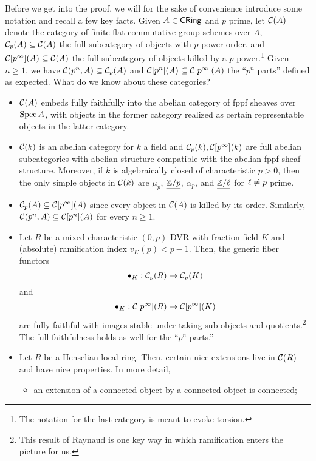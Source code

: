 \documentclass[11pt]{article}
\begin{document}
Before we get into the proof, we will for the sake of convenience introduce some notation and recall a few key facts. Given $A\in\operatorname{\mathsf{CRing}}$ and $p$ prime, let $\mathcal{C}(A)$ denote the category of finite flat commutative group schemes over $A$, $\mathcal{C}_p(A)\subseteq\mathcal{C}(A)$ the full subcategory of objects with $p$-power order, and $\mathcal{C}[p^{\infty}](A)\subseteq\mathcal{C}(A)$ the full subcategory of objects killed by a $p$-power.\footnote{The notation for the last category is meant to evoke torsion.} Given $n\geq1$, we have $\mathcal{C}(p^n,A)\subseteq\mathcal{C}_p(A)$ and $\mathcal{C}[p^n](A)\subseteq\mathcal{C}[p^{\infty}](A)$ the ``$p^n$ parts'' defined as expected. What do we know about these categories?
\begin{itemize}
\item $\mathcal{C}(A)$ embeds fully faithfully into the abelian category of fppf sheaves over $\operatorname{Spec} A$, with objects in the former category realized as certain representable objects in the latter category.

\item $\mathcal{C}(k)$ is an abelian category for $k$ a field and $\mathcal{C}_p(k),\mathcal{C}[p^{\infty}](k)$ are full abelian subcategories with abelian structure compatible with the abelian fppf sheaf structure. Moreover, if $k$ is algebraically closed of characteristic $p>0$, then the only simple objects in $\mathcal{C}(k)$ are $\mu_p$, $\underline{\mathbb{Z}/p}$, $\alpha_p$, and $\underline{\mathbb{Z}/\ell}$ for $\ell\neq p$ prime.

\item $\mathcal{C}_p(A)\subseteq\mathcal{C}[p^{\infty}](A)$ since every object in $\mathcal{C}(A)$ is killed by its order. Similarly, $\mathcal{C}(p^n,A)\subseteq\mathcal{C}[p^n](A)$ for every $n\geq1$.

\item Let $R$ be a mixed characteristic $(0,p)$ DVR with fraction field $K$ and (absolute) ramification index $v_K(p)<p-1$. Then, the generic fiber functors
$$\bullet_K: \mathcal{C}_p(R)\to\mathcal{C}_p(K)$$
and
$$\bullet_K: \mathcal{C}[p^{\infty}](R)\to\mathcal{C}[p^{\infty}](K)$$
are fully faithful with images stable under taking sub-objects and quotients.\footnote{This result of Raynaud is one key way in which ramification enters the picture for us.} The full faithfulness holds as well for the ``$p^n$ parts.''

\item Let $R$ be a Henselian local ring. Then, certain nice extensions live in $\mathcal{C}(R)$ and have nice properties. In more detail,
\begin{itemize}
\item an extension of a connected object by a connected object is connected;


\end{itemize}
\end{itemize}
\end{document}
